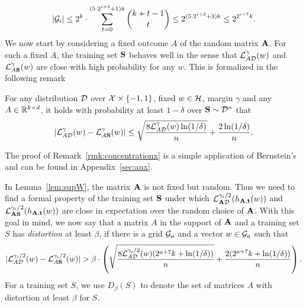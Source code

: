 \begin{align}
|\mathcal{G}_i| \leq 2^k \cdot \sum_{t=0}^{(5 \cdot 2^{i+3}+1) k} \binom{k + t -1}{t} \leq 2^{(5 \cdot 2^{i+3}+3)k} \leq 2^{2^{i+7}k}.\label{eq:netsize}
\end{align}
We now start by considering a fixed outcome $A$ of the random matrix $\mathbf{A}$. For such a fixed $A$, the training set $\mathbf{S}$ behaves well in the sense that $\mathcal{L}^\gamma_{A \mathcal{D}}(w)$ and $\mathcal{L}^\gamma_{A \mathbf{S}}(w)$ are close with high probability for any $w$. This is formalized in the following remark
\begin{remark}
\label{rmk:concentrationx}
For any distribution $\mathcal{D}$ over $\mathcal{X} \times \{-1,1\}$, fixed $w \in \mathcal{H}$, margin $\gamma$ and any $A \in \mathbb{R}^{k \times d}$, it holds with probability at least $1-\delta$ over $\mathbf{S} \sim \mathcal{D}^n$ that
\[
|\mathcal{L}_{A\mathcal{D}}^{\gamma}(w) - \mathcal{L}_{A\mathbf{S}}^{\gamma}(w)| \leq \sqrt{\frac{8\mathcal{L}_{A \mathcal{D}}^{\gamma}(w)\ln(1/\delta)}{n}} + \frac{2 \ln(1/\delta)}{n}.
\]
\end{remark}
The proof of Remark~\ref{rmk:concentrationx} is a simple application of Bernstein's and can be found in Appendix~\ref{sec:aux}.

In Lemma~\ref{lem:supW}, the matrix $\mathbf{A}$ is not fixed but random. Thus we need to find a formal property of the training set $\mathbf{S}$ under which $\mathcal{L}^{\gamma_i/2}_{\mathbf{A} \mathcal{D}}(h_{\mathbf{A},\mathbf{t}}(w))$ and $\mathcal{L}^{\gamma_i/2}_{\mathbf{A} \mathbf{S}}(h_{\mathbf{A},\mathbf{t}}(w))$ are close in expectation over the random choice of $\mathbf{A}$. With this goal in mind, we now say that a matrix $A$ in the support of $\mathbf{A}$ and a training set $S$ has \emph{distortion} at least $\beta$, if there is a grid $\mathcal{G}_a$ and a vector $w \in \mathcal{G}_a$ such that
\[
|\mathcal{L}_{A\mathcal{D}}^{\gamma_i/2}(w) - \mathcal{L}_{A\mathbf{S}}^{\gamma_i/2}(w)| > \beta \cdot \left(\sqrt{\frac{8\mathcal{L}_{A \mathcal{D}}^{\gamma_i/2}(w)(2^{a+7}k + \ln(1/\delta))}{n}} + \frac{2 (2^{a+7}k + \ln(1/\delta))}{n}\right).
\]
For a training set $S$, we use $D_\beta(S)$ to denote the set of matrices $A$ with distortion at least $\beta$ for $S$.

